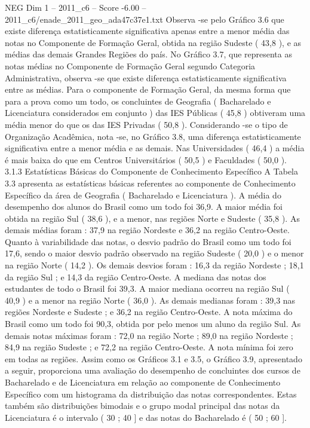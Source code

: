 \begin{textsample}{NEG Dim 1 – 2011\_c6 – Score -6.00 – 2011\_c6/enade\_2011\_geo\_ada47c37e1.txt}
Observa -se pelo Gráfico 3.6 que existe diferença estatisticamente significativa apenas entre a menor média das notas no Componente de Formação Geral, obtida na região Sudeste ( 43,8 ), e as médias das demais Grandes Regiões do país.
No Gráfico 3.7, que representa as notas médias no Componente de Formação Geral segundo Categoria Administrativa, observa -se que existe diferença estatisticamente significativa entre as médias.
Para o componente de Formação Geral, da mesma forma que para a prova como um todo, os concluintes de Geografia ( Bacharelado e Licenciatura considerados em conjunto ) das IES Públicas ( 45,8 ) obtiveram uma média menor do que os das IES Privadas ( 50,8 ).
Considerando -se o tipo de Organização Acadêmica, nota -se, no Gráfico 3.8, uma diferença estatisticamente significativa entre a menor média e as demais.
Nas Universidades ( 46,4 ) a média é mais baixa do que em Centros Universitários ( 50,5 ) e Faculdades ( 50,0 ). 3.1.3 Estatísticas Básicas do Componente de Conhecimento Específico A Tabela 3.3 apresenta as estatísticas básicas referentes ao componente de Conhecimento Específico da área de Geografia ( Bacharelado e Licenciatura ).
A média do desempenho dos alunos do Brasil como um todo foi 36,9.
A maior média foi obtida na região Sul ( 38,6 ), e a menor, nas regiões Norte e Sudeste ( 35,8 ).
As demais médias foram : 37,9 na região Nordeste e 36,2 na região Centro-Oeste.
Quanto à variabilidade das notas, o desvio padrão do Brasil como um todo foi 17,6, sendo o maior desvio padrão observado na região Sudeste ( 20,0 ) e o menor na região Norte ( 14,2 ).
Os demais desvios foram : 16,3 da região Nordeste ; 18,1 da região Sul ; e 14,3 da região Centro-Oeste.
A mediana das notas dos estudantes de todo o Brasil foi 39,3.
A maior mediana ocorreu na região Sul ( 40,9 ) e a menor na região Norte ( 36,0 ).
As demais medianas foram : 39,3 nas regiões Nordeste e Sudeste ; e 36,2 na região Centro-Oeste.
A nota máxima do Brasil como um todo foi 90,3, obtida por pelo menos um aluno da região Sul.
As demais notas máximas foram : 72,0 na região Norte ; 89,0 na região Nordeste ; 84,9 na região Sudeste ; e 72,2 na região Centro-Oeste.
A nota mínima foi zero em todas as regiões.
Assim como os Gráficos 3.1 e 3.5, o Gráfico 3.9, apresentado a seguir, proporciona uma avaliação do desempenho de concluintes dos cursos de Bacharelado e de Licenciatura em relação ao componente de Conhecimento Específico com um histograma da distribuição das notas correspondentes.
Estas também são distribuições bimodais e o grupo modal principal das notas da Licenciatura é o intervalo ( 30 ; 40 ] e das notas do Bacharelado é ( 50 ; 60 ].

\end{textsample}
